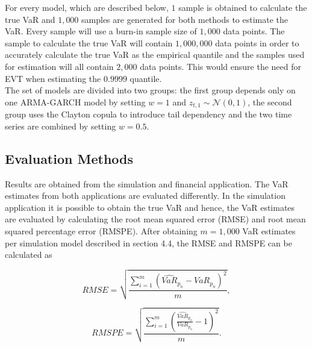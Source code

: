 \documentclass[a4paper,12pt]{article}
\theoremstyle{plain}
\begin{document}
For every model, which are described below, $1$ sample is obtained to calculate the true VaR and $1,000$ samples are generated for both methods to estimate the VaR. Every sample will use a burn-in sample size of $1,000$ data points. The sample to calculate the true VaR will contain $1,000,000$ data points in order to accurately calculate the true VaR as the empirical quantile and the samples used for estimation will all contain $2,000$ data points. This would ensure the need for EVT when estimating the $0.9999$ quantile.\\

The set of models are divided into two groups: the first group depends only on one ARMA-GARCH model by setting $w=1$ and $z_{t,1}\sim \mathcal{N}\left(0, 1\right)$, the second group uses the Clayton copula to introduce tail dependency and the two time series are combined by setting $w=0.5$.

\subsection{Evaluation Methods}
Results are obtained from the simulation and financial application. The VaR estimates from both applications are evaluated differently. In the simulation application it is possible to obtain the true VaR and hence, the VaR estimates are evaluated by calculating the root mean squared error (RMSE) and root mean squared percentage error (RMSPE). After obtaining $m=1,000$ VaR estimates per simulation model described in section 4.4, the RMSE and RMSPE can be calculated as

\begin{equation}
    RMSE = \sqrt{\frac{\sum^m_{i=1}\left(\widehat{VaR}_{p_n} - VaR_{p_n}\right)^2}{m}},
    \label{eq:rmse}
\end{equation}

\begin{equation}
    RMSPE = \sqrt{\frac{\sum^m_{i=1}\left(\frac{\widehat{VaR}_{p_n}}{VaR_{p_n}} - 1\right)^2}{m}}.
    \label{eq:mape}
\end{equation}
 \\
\end{document}
